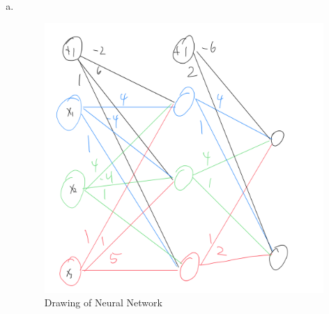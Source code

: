 \documentclass[12pt]{article}
\title{} %
\author{Liheng Cao} %
\date{\today} %
\begin{document}
\maketitle

\section{}
\begin{enumerate}[(a)]
	\item \, \begin{figure}[H]
		\centering
		\includegraphics[height=\pdfpageheight*1/3]{images/1a.png}
		\caption{Drawing of Neural Network}
		\label{fig:1:a}
	\end{figure}
	

\end{enumerate}
\end{document}
